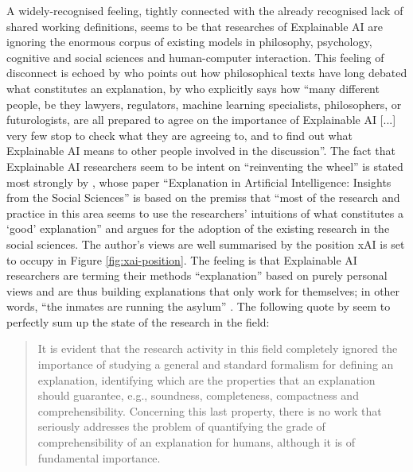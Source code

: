 A widely-recognised feeling, tightly connected with the already recognised lack of shared working definitions, seems to be that researches of Explainable AI are ignoring the enormous corpus of existing models in philosophy, psychology, cognitive and social sciences and human-computer interaction.
This feeling of disconnect is echoed by \citet{gilpin2018explaining} who points out how philosophical texts have long debated what constitutes an explanation, by \citet{mittelstadt2019explaining} who explicitly says how \enquote{many different people, be they lawyers, regulators, machine learning specialists, philosophers, or futurologists, are all prepared to agree on the importance of Explainable AI [...] very few stop to check what they are agreeing to, and to find out what Explainable AI means to other people involved in the discussion}.
The fact that Explainable AI researchers seem to be intent on \enquote{reinventing the wheel} is stated most strongly by \citet{miller2018explanation}, whose paper \enquote{Explanation in Artificial Intelligence: Insights from the Social Sciences} is based on the premiss that \enquote{most of the research and practice in this area seems to use the researchers' intuitions of what constitutes a `good' explanation} and argues for the adoption of the existing research in the social sciences.
The author's views are well summarised by the position xAI is set to occupy in Figure \ref{fig:xai-position}.
The feeling is that Explainable AI researchers are terming their methods \enquote{explanation} based on purely personal views and are thus building explanations that only work for themselves; in other words, \enquote{the inmates are running the asylum} \citep{Miller2017}.
The following quote by \citet{guidotti2018survey} seem to perfectly sum up the state of the research in the field: 
\begin{quotation}
	It is evident that the research activity in this field completely ignored the importance of studying a general and standard formalism for defining an explanation, identifying which are the properties that an explanation should guarantee, e.g., soundness, completeness, compactness and comprehensibility. Concerning this last property, there is no work that seriously addresses the problem of quantifying the grade of comprehensibility of an explanation for humans, although it is of fundamental importance. 
	
	\hfill \citep[pag. 37]{guidotti2018survey}
\end{quotation}

